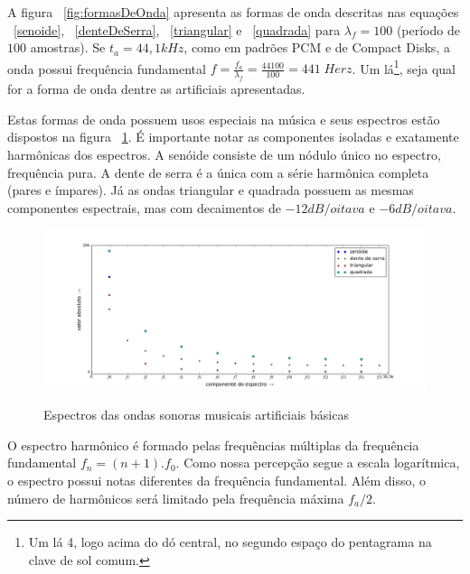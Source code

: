 A figura ~\ref{fig:formasDeOnda} apresenta
as formas de onda descritas nas equações ~\ref{senoide}, ~\ref{denteDeSerra}, ~\ref{triangular} e ~\ref{quadrada} para $\lambda_f=100$ (período
de $100$ amostras).
Se $t_a=44,1 kHz$, como em padrões PCM e de Compact Disks, a onda possui frequência fundamental $f=\frac{f_a}{\lambda_f}=\frac{44100}{100} = 441 \; Herz $. Um lá\footnote{Um lá 4, logo acima do dó central, no segundo espaço do pentagrama na clave de sol comum.}, seja qual for a forma de onda dentre as artificiais apresentadas.

Estas formas de onda possuem usos especiais na música e seus espectros estão dispostos na figura ~\ref{fig:espectroDeOndas}. É importante notar as componentes isoladas e exatamente harmônicas dos espectros. A senóide consiste de um nódulo único no espectro, frequência pura. A dente de serra é a única com a série harmônica completa (pares e ímpares). Já as ondas triangular e quadrada possuem as mesmas componentes espectrais, mas com decaimentos de $-12dB/oitava$ e $-6dB/oitava$.

\begin{figure}[h!]
    \centering
    \caption{Espectros das ondas sonoras musicais artificiais básicas}
        \includegraphics[width=\textwidth]{figuras/espectroDeOndas5b}
        \label{fig:espectroDeOndas}
\end{figure}


O espectro harmônico é formado pelas frequências múltiplas da frequência fundamental $f_n=(n+1).f_0$. Como nossa percepção segue a escala logarítmica, o espectro possui notas diferentes da frequência fundamental. Além disso, o número de harmônicos será limitado pela frequência máxima $f_a/2$. 

